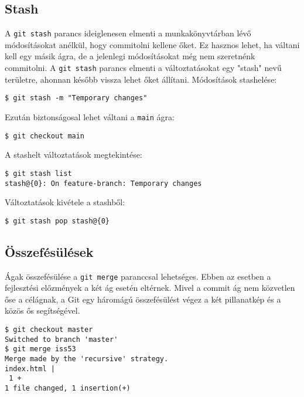 \documentclass{article}
\begin{document}
\subsection*{Stash}
A \texttt{git stash} parancs ideiglenesen elmenti a munkakönyvtárban lévő módosításokat anélkül, hogy commitolni kellene őket. Ez hasznos lehet, ha váltani kell egy másik ágra, de a jelenlegi módosításokat még nem szeretnénk commitolni. A \texttt{git stash} parancs elmenti a változtatásokat egy "stash" nevű területre, ahonnan később vissza lehet őket állítani.
\vspace{0.2cm}
Módosítások stashelése:
\begin{lstlisting}
$ git stash -m "Temporary changes"
\end{lstlisting}
Ezután biztonságosal lehet váltani a \texttt{main} ágra:
\begin{lstlisting}
$ git checkout main
\end{lstlisting}
A stashelt változtatások megtekintése:
\begin{lstlisting}
$ git stash list
stash@{0}: On feature-branch: Temporary changes
\end{lstlisting}
Változtatások kivétele a stashből:
\begin{lstlisting}
$ git stash pop stash@{0}
\end{lstlisting}

\subsection*{Összefésülések}
Ágak összefésülése a \texttt{git merge} paranccsal lehetséges. Ebben az esetben a fejlesztési előzmények a két ág esetén eltérnek. Mivel a commit ág nem közvetlen őse a célágnak, a Git egy háromágú összefésülést végez a két pillanatkép és a közös ős segítségével.
\begin{lstlisting}
$ git checkout master
Switched to branch 'master'
$ git merge iss53
Merge made by the 'recursive' strategy.
index.html |
 1 +
1 file changed, 1 insertion(+)
\end{lstlisting}
\end{document}
